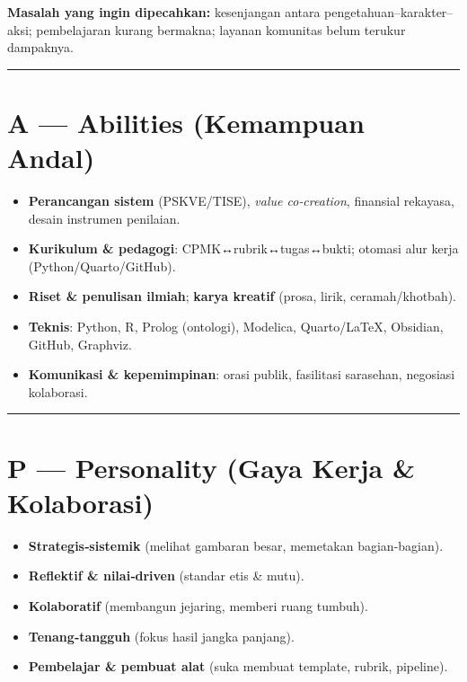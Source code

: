 \documentclass[
  letterpaper,
  DIV=11,
  numbers=noendperiod]{scrreprt}
\providecommand{\tightlist}{%
  \setlength{\itemsep}{0pt}\setlength{\parskip}{0pt}}
\begin{document}
\textbf{Masalah yang ingin dipecahkan:} kesenjangan antara
pengetahuan--karakter--aksi; pembelajaran kurang bermakna; layanan
komunitas belum terukur dampaknya.

\begin{center}\rule{0.5\linewidth}{0.5pt}\end{center}

\section{A --- Abilities (Kemampuan
Andal)}\label{a-abilities-kemampuan-andal}

\begin{itemize}
\tightlist
\item
  \textbf{Perancangan sistem} (PSKVE/TISE), \emph{value co‑creation},
  finansial rekayasa, desain instrumen penilaian.
\item
  \textbf{Kurikulum \& pedagogi}: CPMK↔rubrik↔tugas↔bukti; otomasi alur
  kerja (Python/Quarto/GitHub).
\item
  \textbf{Riset \& penulisan ilmiah}; \textbf{karya kreatif} (prosa,
  lirik, ceramah/khotbah).
\item
  \textbf{Teknis}: Python, R, Prolog (ontologi), Modelica, Quarto/LaTeX,
  Obsidian, GitHub, Graphviz.
\item
  \textbf{Komunikasi \& kepemimpinan}: orasi publik, fasilitasi
  sarasehan, negosiasi kolaborasi.
\end{itemize}

\begin{center}\rule{0.5\linewidth}{0.5pt}\end{center}

\section{P --- Personality (Gaya Kerja \&
Kolaborasi)}\label{p-personality-gaya-kerja-kolaborasi}

\begin{itemize}
\tightlist
\item
  \textbf{Strategis‑sistemik} (melihat gambaran besar, memetakan
  bagian-bagian).
\item
  \textbf{Reflektif \& nilai‑driven} (standar etis \& mutu).
\item
  \textbf{Kolaboratif} (membangun jejaring, memberi ruang tumbuh).
\item
  \textbf{Tenang‑tangguh} (fokus hasil jangka panjang).
\item
  \textbf{Pembelajar \& pembuat alat} (suka membuat template, rubrik,
  pipeline).
\end{itemize}
\end{document}
